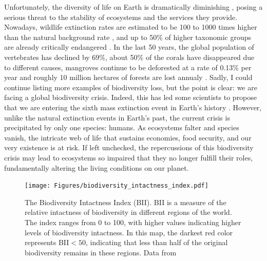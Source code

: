 Unfortunately, the diversity of life on Earth is dramatically diminishing
\cite{Hughes1997,Ceballos2002,Pereira2010}, posing a serious threat to the
stability of ecosystems and the services they provide. Nowadays, wildlife
extinction rates are estimated to be 100 to 1000 times higher than the natural
background rate \cite{Ceballos2015,Pimm2014}, and up to 50\% of higher
taxonomic groups are already critically endangered \cite{Smith2009}. In the
last 50 years, the global population of vertebrates has declined by 69\%, about
50\% of the corals have disappeared due to different causes, mangroves
continue to be deforested at a rate of 0.13\% per year and roughly 10 million
hectares of forests are lost annualy \cite{WWF2022}. Sadly, I could continue
listing more examples of biodiversity loss, but the point is clear: we are
facing a global biodiversity crisis. Indeed, this has led some scientists to
propose that we are entering the sixth mass extinction event in Earth's history
\cite{Barnosky2011}. However, unlike the natural extinction events in Earth’s
past, the current crisis is precipitated by only one species: humans. As
ecosystems falter and species vanish, the intricate web of life that sustains
economies, food security, and our very existence is at risk. If left unchecked,
the repercussions of this biodiversity crisis may lead to ecosystems so
impaired that they no longer fulfill their roles, fundamentally altering the
living conditions on our planet.

\begin{figure}[H]
  \centering

  \texttt{[image: Figures/biodiversity\_intactness\_index.pdf]}
  \caption{\label{fig:biodiversity_intactness_index} The Biodiversity
    Intactness Index (BII). BII is a measure of the relative intactness of
    biodiversity in	different regions of the world. The index ranges from 0
    to 100, with higher values indicating higher levels of biodiversity
    intactness. In this map, the darkest red color represents BII$<50$,
    indicating that less than half of the original biodiversity remains in
    these regions. Data from \cite{Newbold2016}}
\end{figure}

